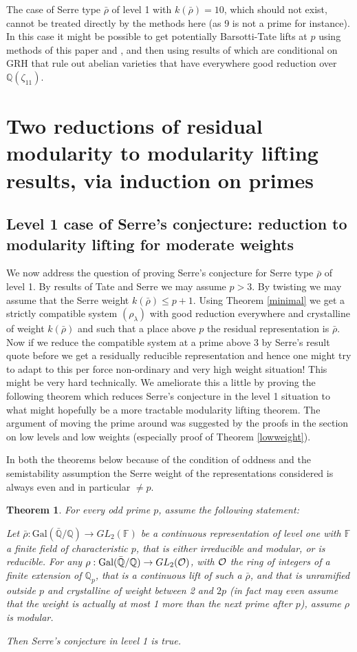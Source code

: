 \documentclass[12pt]{article}
\newcommand{\Q}{\mathbb{Q}}
\newcommand{\rhobar}{\overline{\rho}}
\newtheorem{theorem}{Theorem}[section]
\newcommand{\FF}{ {\mathbb F} }
\def\rhobar{ {\bar {\rho} } }
\def\rhob{ {\bar {\rho} } }
\newcommand{\Galois}{\mathrm{Gal}}
\newcommand{\Gal}{\Galois( \bar{ {\mathbb Q}}/{\mathbb Q})}
\begin{document}
 The case of Serre type $\rhob$ of level 1 with
$k(\rhob)=10$, which should not exist, cannot be treated directly by
the methods here (as 9 is not a prime for
instance). In this case it might be possible to get potentially
Barsotti-Tate lifts at $p$ using methods of this paper and
\cite{Conrad}, and then using results of \cite{Schoof2} which are
conditional on GRH that rule out abelian varieties that have
everywhere
good reduction over $\Q(\zeta_{11})$.


\section{Two reductions of residual modularity to modularity lifting
results,
via induction on primes}

\subsection{Level 1 case of Serre's conjecture: reduction
to modularity lifting for moderate weights}

We now address the question of proving Serre's conjecture for Serre
type
$\rhob$ of level 1. By results of Tate and Serre we may assume $p>3$.
By twisting we may assume that the Serre weight $k(\rhob) \leq p+1$. Using
Theorem \ref{minimal} we get a strictly compatible system
$(\rho_\lambda)$ with good reduction everywhere and crystalline of weight
$k(\rhobar)$ and such that a place above $p$ the residual representation is
$\rhob$. Now if we reduce
the compatible system at a prime above 3 by Serre's result quote before
we get a residually reducible representation and
hence one might try to adapt \cite{SW2} to this per force non-ordinary and
very
high
weight situation! This might be very hard technically.
We ameliorate this a little by proving the following theorem which reduces
Serre's conjecture in the level 1 situation to what might hopefully be a
more tractable
modularity lifting theorem. The argument of moving the prime around was
suggested by the proofs in the section
on low levels and low weights (especially proof of Theorem \ref{lowweight}).

In both the theorems below because of the condition of oddness and the
semistability assumption the Serre weight of the representations
considered is always even and in particular $\neq p$.

\begin{theorem}\label{bertrand}
 For every odd prime $p$, assume the following statement:

Let $\rhob:\Gal \rightarrow GL_2(\FF)$ be a continuous representation of
level
one with $\FF$ a finite field of characteristic
 $p$, that is either irreducible and modular, or is reducible.
 For any $\rho:\Gal \rightarrow GL_2({\cal O})$, with ${\cal O}$ the ring of
integers of a finite extension of $\Q_p$,
 that is a continuous lift of such a $\rhob$, and
 that is unramified outside $p$ and crystalline
 of weight between 2 and $2p$ (in fact may even assume that the weight is
actually at most 1 more than the next prime after $p$), assume $\rho$ is
modular.

Then Serre's conjecture in level 1 is true.
\end{theorem}
\end{document}
